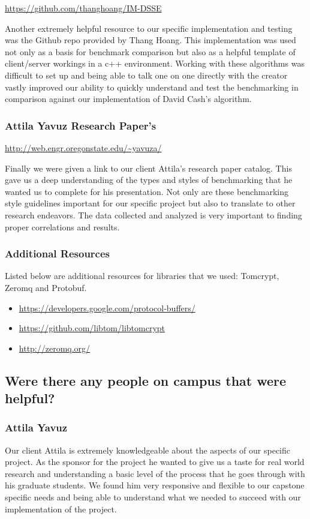 \url{https://github.com/thanghoang/IM-DSSE}

Another extremely helpful resource to our specific implementation and testing was the Github repo provided by Thang Hoang. This implementation was used not only as a basis for benchmark comparison but also as a helpful template of client/server workings in a c++ environment. Working with these algorithms was difficult to set up and being able to talk one on one directly with the creator vastly improved our ability to quickly understand and test the benchmarking in comparison against our implementation of David Cash’s algorithm.

\subsubsection{Attila Yavuz Research Paper's}

\url{http://web.engr.oregonstate.edu/~yavuza/}

Finally we were given a link to our client Attila’s research paper catalog. This gave us a deep understanding of the types and styles of benchmarking that he wanted us to complete for his presentation. Not only are these benchmarking style guidelines important for our specific project but also to translate to other research endeavors. The data collected and analyzed is very important to finding proper correlations and results.

\subsubsection{Additional Resources}

Listed below are additional resources for libraries that we used: Tomcrypt, Zeromq and Protobuf.

\begin{itemize}
\item \url{https://developers.google.com/protocol-buffers/}
\item \url{https://github.com/libtom/libtomcrypt}
\item \url{http://zeromq.org/}
\end{itemize}

\subsection {Were there any people on campus that were helpful?}
\subsubsection{Attila Yavuz}
Our client Attila is extremely knowledgeable about the aspects of our specific project. As the sponsor for the project he wanted to give us a taste for real world research and understanding a basic level of the process that he goes through with his graduate students. We found him very responsive and flexible to our capstone specific needs and being able to understand what we needed to succeed with our implementation of the project.

